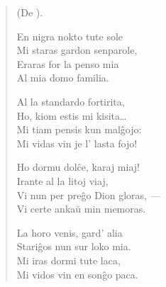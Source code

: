 \begin{verse}
\begin{center}
\footnotesize (De ).
\end{center}
                        En nigra nokto tute sole\\
                        Mi staras gardon senparole,\\
                        Eraras for la penso mia\\
                        Al mia domo familia.

                        Al la standardo fortirita,\\
                        Ho, kiom estis mi kisita\dots\\
                        Mi tiam pensis kun mal\^gojo:\\
                        Mi vidas vin je l' lasta fojo!

                        Ho dormu dol\^ce, karaj miaj!\\
                        Irante al la litoj viaj,\\
                        Vi nun per pre\^go Dion gloras, ---\\
                        Vi certe anka\u u min memoras.

                        La horo venis, gard' alia\\
                        Stari\^gos nun sur loko mia.\\
                        Mi iras dormi tute laca,\\
                        Mi vidos vin en son\^go paca.

\end{verse}


\smallrule{}
